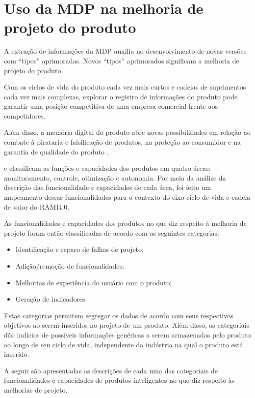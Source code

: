 \section{Uso da MDP na melhoria de projeto do produto}

	A extração de informações da MDP auxilia no desenvolvimento de novas versões com ``tipos'' aprimoradas. Novos ``tipos'' aprimorados significam a melhoria de projeto do produto.

	Com os ciclos de vida do produto cada vez mais curtos e cadeias de suprimentos cada vez mais complexas, explorar o registro de informações do produto pode garantir uma posição competitiva de uma empresa comercial frente aos competidores.
	
	Além disso, a memória digital do produto abre novas possibilidades em relação ao combate à pirataria e falsificação de produtos, na proteção ao consumidor e na garantia de qualidade do produto \cite{wahlster2007digitalmemory}.
	
	 e  classificam as funções e capacidades dos produtos em quatro áreas: monitoramento, controle, otimização e autonomia. Por meio da análise da descrição das funcionalidade e capacidades de cada área, foi feito um mapeamento dessas funcionalidades para o contexto do eixo ciclo de vida e cadeia de valor do RAMI4.0.
	
	As funcionalidades e capacidades dos produtos no que diz respeito à melhoria de projeto foram então classificadas de acordo com as seguintes categorias:
	
	\begin{itemize}
		\item Identificação e reparo de falhas de projeto;
		\item Adição/remoção de funcionalidades;
		\item Melhorias de experiência do usuário com o produto;
		\item Geração de indicadores.
	\end{itemize}

	Estas categorias permitem segregar os dados de acordo com seus respectivos objetivos ao serem inseridos no projeto de um produto. Além disso, as categoriais dão indícios de possíveis informações genéricas a serem armazenadas pelo produto ao longo de seu ciclo de vida, independente da indústria na qual o produto está inserido.
	
	A seguir são apresentadas as descrições de cada uma das categoriais de funcionalidades e capacidades de produtos inteligentes no que diz respeito às melhorias de projeto.
	
